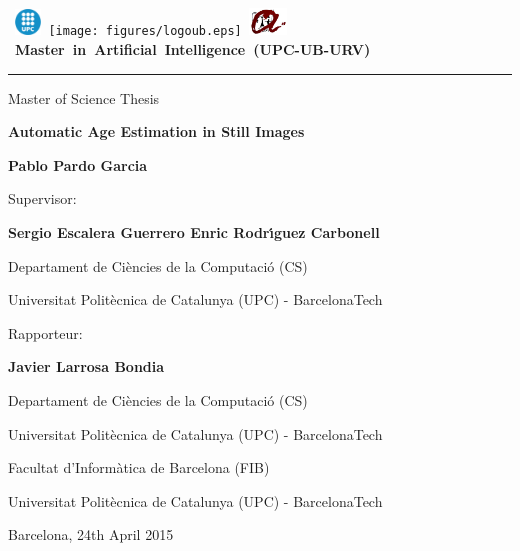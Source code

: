 \thispagestyle{empty}
\vspace*{-2cm}

\hbox{
\includegraphics[width=0.7cm]{figures/logoupc.eps}
\texttt{[image: figures/logoub.eps]}
\includegraphics[width=1cm]{figures/logourv.eps}
\Large \bf Master in Artificial Intelligence (UPC-UB-URV)}
\hrule

\bigskip\bigskip\bigskip

\begin{center}

{\LARGE Master of Science Thesis}

\bigskip\bigskip\bigskip\bigskip\bigskip

\textbf{\huge \bf Automatic Age Estimation in Still Images}

\bigskip\bigskip\bigskip\bigskip\bigskip

{\LARGE \bf Pablo Pardo Garcia}

\vspace*{5cm}

{\large Supervisor:}

\medskip\medskip\smallskip

{\Large\bf Sergio Escalera Guerrero \qquad Enric Rodr{\'\i}guez Carbonell}

\medskip\medskip

{\Large Departament de Ci{\`e}ncies de la Computaci{\'o} (CS)}

\medskip

{\Large Universitat Polit{\`e}cnica de Catalunya (UPC) - BarcelonaTech}


\bigskip\bigskip\bigskip

{\large Rapporteur:}

\medskip\medskip\smallskip

{\Large\bf Javier Larrosa Bondia}

\medskip\medskip

{\Large Departament de Ci{\`e}ncies de la Computaci{\'o} (CS)}

\medskip

{\Large Universitat Polit{\`e}cnica de Catalunya (UPC) - BarcelonaTech}

\bigskip\bigskip\bigskip\bigskip\bigskip

{\Large Facultat d'Inform{\`a}tica de Barcelona (FIB)}

\medskip

{\Large Universitat Polit{\`e}cnica de Catalunya (UPC) - BarcelonaTech}

\medskip\medskip\medskip\medskip\medskip

{\Large Barcelona, 24th April 2015}

\end{center}


